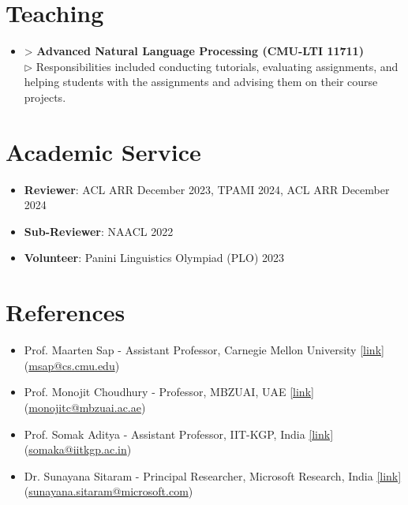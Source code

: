 \documentclass[11pt,letterpaper]{article}
\begin{document}
\section*{Teaching}
\begin{itemize}[leftmargin=*,label={},itemsep=4pt]
    \item > \textbf{Advanced Natural Language Processing (CMU-LTI 11711)}\\
        $\triangleright$ 
            Responsibilities included conducting tutorials, evaluating assignments, and helping students with the assignments and advising them on their course projects.
        \\
\end{itemize}

\section*{Academic Service}
\begin{itemize}[leftmargin=*,label={},itemsep=4pt]
    \item \textbf{Reviewer}: ACL ARR December 2023, TPAMI 2024, ACL ARR December 2024\
    \item \textbf{Sub-Reviewer}: NAACL 2022\
    \item \textbf{Volunteer}: Panini Linguistics Olympiad (PLO) 2023\
\end{itemize}

\section*{References}
\begin{itemize}[leftmargin=*,label={},itemsep=4pt]
    \item 
             Prof. Maarten Sap - Assistant Professor, Carnegie Mellon University  \href{https://homes.cs.washington.edu/~msap/}{[link]}
         (\href{mailto:msap@cs.cmu.edu}{msap@cs.cmu.edu})\
    \item 
             Prof. Monojit Choudhury - Professor, MBZUAI, UAE  \href{https://www.microsoft.com/en-us/research/people/monojitc/}{[link]}
         (\href{mailto:monojitc@mbzuai.ac.ae}{monojitc@mbzuai.ac.ae})\
    \item 
             Prof. Somak Aditya - Assistant Professor, IIT-KGP, India  \href{https://somak.cse.iitkgp.ac.in/}{[link]}
         (\href{mailto:somaka@iitkgp.ac.in}{somaka@iitkgp.ac.in})\
    \item 
             Dr. Sunayana Sitaram - Principal Researcher, Microsoft Research, India  \href{https://www.microsoft.com/en-us/research/people/susitara/}{[link]}
         (\href{mailto:sunayana.sitaram@microsoft.com}{sunayana.sitaram@microsoft.com})\
\end{itemize}
\end{document}
